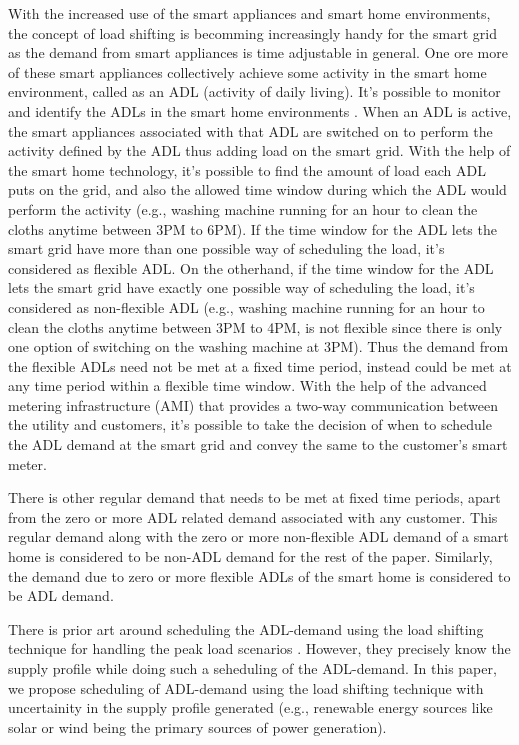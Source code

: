 With the increased use of the smart appliances and smart home environments, the concept of load shifting is becomming increasingly handy for the smart grid as the demand from smart appliances is time adjustable in general. One ore more of these smart appliances collectively achieve some activity in the smart home environment, called as an ADL (activity of daily living). It's possible to monitor and identify the ADLs in the smart home environments \cite{I2014, GPG2016}. When an ADL is active, the smart appliances associated with that ADL are switched on to perform the activity defined by the ADL thus adding load on the smart grid. With the help of the smart home technology, it's possible to find the amount of load each ADL puts on the grid, and also the allowed time window during which the ADL would perform the activity (e.g., washing machine running for an hour to clean the cloths anytime between 3PM to 6PM). If the time window for the ADL lets the smart grid have more than one possible way of scheduling the load, it's considered as flexible ADL. On the otherhand, if the time window for the ADL lets the smart grid have exactly one possible way of scheduling the load, it's considered as non-flexible ADL (e.g., washing machine running for an hour to clean the cloths anytime between 3PM to 4PM, is not flexible since there is only one option of switching on the washing machine at 3PM). Thus the demand from the flexible ADLs need not be met at a fixed time period, instead could be met at any time period within a flexible time window. With the help of the advanced metering infrastructure (AMI) \cite{RAFK2014} that provides a two-way communication between the utility and customers, it's possible to take the decision of when to schedule the ADL demand at the smart grid and convey the same to the customer's smart meter.    

There is other regular demand that needs to be met at fixed time periods, apart from the zero or more ADL related demand associated with any customer. This regular demand along with the zero or more non-flexible ADL demand of a smart home is considered to be non-ADL demand for the rest of the paper. Similarly, the demand due to zero or more flexible ADLs of the smart home is considered to be ADL demand.
 
There is prior art around scheduling the ADL-demand using the load shifting technique for handling the peak load scenarios \cite{CL2014}. However, they precisely know the supply profile while doing such a seheduling of the ADL-demand. In this paper, we propose scheduling of ADL-demand using the load shifting technique with uncertainity in the supply profile generated (e.g., renewable energy sources like solar or wind being the primary sources of power generation).

